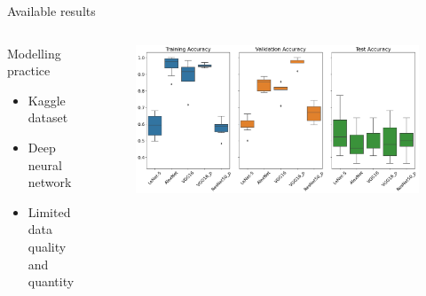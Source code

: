\documentclass[aspectratio=169]{beamer}
\begin{document}
\begin{frame}{Available results}
    \pause
    \begin{columns}[T]
        \begin{column}{0.45\textwidth}
            Modelling practice
            \begin{itemize}
                \item Kaggle dataset
                \item Deep neural network
                \item Limited data quality and quantity
            \end{itemize}
        \end{column}
        \pause
        \begin{column}{0.45\textwidth}
            \begin{figure}[H]
                \centering
                \includegraphics[height=0.4\textheight]{./tex_images/bootstrap_results.png}
            \end{figure}
        \end{column}
    \end{columns}
    \pause


\end{frame}
\end{document}

